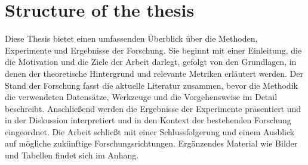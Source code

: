 


\section{Structure of the thesis}


Diese Thesis bietet einen umfassenden Überblick über die Methoden, Experimente und Ergebnisse der Forschung. Sie beginnt mit einer Einleitung, die die Motivation und die Ziele der Arbeit darlegt, gefolgt von den Grundlagen, in denen der theoretische Hintergrund und relevante Metriken erläutert werden. Der Stand der Forschung fasst die aktuelle Literatur zusammen, bevor die Methodik die verwendeten Datensätze, Werkzeuge und die Vorgehensweise im Detail beschreibt. Anschließend werden die Ergebnisse der Experimente präsentiert und in der Diskussion interpretiert und in den Kontext der bestehenden Forschung eingeordnet. Die Arbeit schließt mit einer Schlussfolgerung und einem Ausblick auf mögliche zukünftige Forschungsrichtungen. Ergänzendes Material wie Bilder und Tabellen findet sich im Anhang.
